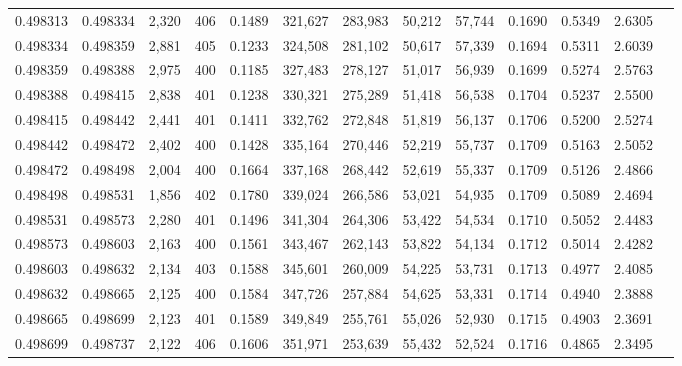 \begin{tabular}{rrrrrrrrrrrrr}
0.498313 & 0.498334 & 2,320 & 406 &                                     0.1489 & 321,627 & 283,983 &  50,212 &  57,744 & 0.1690 & 0.5349 & 2.6305 \\
0.498334 & 0.498359 & 2,881 & 405 &                                     0.1233 & 324,508 & 281,102 &  50,617 &  57,339 & 0.1694 & 0.5311 & 2.6039 \\
0.498359 & 0.498388 & 2,975 & 400 &                                     0.1185 & 327,483 & 278,127 &  51,017 &  56,939 & 0.1699 & 0.5274 & 2.5763 \\
0.498388 & 0.498415 & 2,838 & 401 &                                     0.1238 & 330,321 & 275,289 &  51,418 &  56,538 & 0.1704 & 0.5237 & 2.5500 \\
0.498415 & 0.498442 & 2,441 & 401 &                                     0.1411 & 332,762 & 272,848 &  51,819 &  56,137 & 0.1706 & 0.5200 & 2.5274 \\
0.498442 & 0.498472 & 2,402 & 400 &                                     0.1428 & 335,164 & 270,446 &  52,219 &  55,737 & 0.1709 & 0.5163 & 2.5052 \\
0.498472 & 0.498498 & 2,004 & 400 &                                     0.1664 & 337,168 & 268,442 &  52,619 &  55,337 & 0.1709 & 0.5126 & 2.4866 \\
0.498498 & 0.498531 & 1,856 & 402 &                                     0.1780 & 339,024 & 266,586 &  53,021 &  54,935 & 0.1709 & 0.5089 & 2.4694 \\
0.498531 & 0.498573 & 2,280 & 401 &                                     0.1496 & 341,304 & 264,306 &  53,422 &  54,534 & 0.1710 & 0.5052 & 2.4483 \\
0.498573 & 0.498603 & 2,163 & 400 &                                     0.1561 & 343,467 & 262,143 &  53,822 &  54,134 & 0.1712 & 0.5014 & 2.4282 \\
0.498603 & 0.498632 & 2,134 & 403 &                                     0.1588 & 345,601 & 260,009 &  54,225 &  53,731 & 0.1713 & 0.4977 & 2.4085 \\
0.498632 & 0.498665 & 2,125 & 400 &                                     0.1584 & 347,726 & 257,884 &  54,625 &  53,331 & 0.1714 & 0.4940 & 2.3888 \\
0.498665 & 0.498699 & 2,123 & 401 &                                     0.1589 & 349,849 & 255,761 &  55,026 &  52,930 & 0.1715 & 0.4903 & 2.3691 \\
0.498699 & 0.498737 & 2,122 & 406 &                                     0.1606 & 351,971 & 253,639 &  55,432 &  52,524 & 0.1716 & 0.4865 & 2.3495 \\

\end{tabular}
